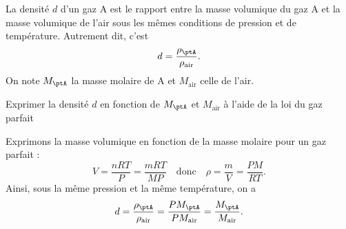 \hauteurLargeurCadreReponse		{7mm}{3cm}
\typeEntrainement				{} %
\initialisationEntrainement

La densité $d$ d’un gaz A est le rapport entre la masse volumique du gaz A et la masse volumique de l’air sous les mêmes conditions de pression et de température. Autrement dit, c'est 
\[
d=\frac{\rho_{\ptA}}{\rho_\text{air}}.
\]
On note $M_\ptA$ la masse molaire de A et $M_\text{air}$ celle de l'air.

\debutEntrainement

\begin{enonce}
Exprimer la densité $d$ en fonction de $M_\ptA$ et $M_\text{air}$ à l'aide de la loi du gaz parfait
\end{enonce}


\begin{corrige}
Exprimons la masse volumique en fonction de la masse molaire pour un gaz parfait : 
\[
V=\frac{nRT}{P}=\frac{mRT}{MP}
\quad\text{donc}\quad
\rho =\frac{m}{V}=\frac{PM}{RT}.
\] Ainsi, sous la même pression et la même température, on a 
$$
d=\frac{\rho_\ptA}{\rho_\text{air}}=
\frac{PM_\ptA}{PM_\text{air}}=\frac{M_\ptA}{M_\text{air}}.
$$
\end{corrige}

\finEntrainement





